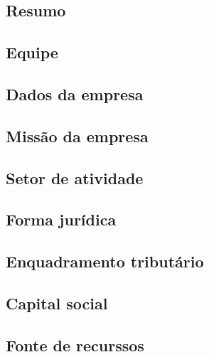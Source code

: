 \subsection{Resumo}

\subsection{Equipe}

\subsection{Dados da empresa}

\subsection{Missão da empresa}

\subsection{Setor de atividade}

\subsection{Forma jurídica}

\subsection{Enquadramento tributário}

\subsection{Capital social}

\subsection{Fonte de recurssos}